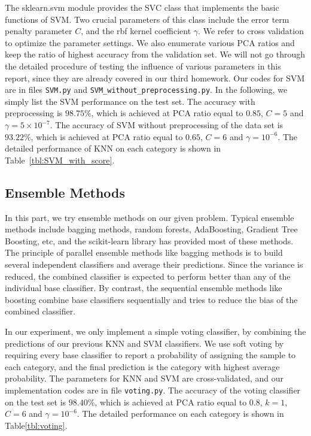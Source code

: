 \documentclass{article}
\begin{document}
The sklearn.svm module provides the SVC class that implements the basic functions of SVM. Two crucial parameters of this class include the error term penalty parameter $C$, and the rbf kernel coefficient $\gamma$. We refer to cross validation to optimize the parameter settings. We also enumerate various PCA ratios and keep the ratio of highest accuracy from the validation set. We will not go through the detailed procedure of testing the influence of various parameters in this report, since they are already covered in our third homework. Our codes for SVM are in files \texttt{SVM.py} and \texttt{SVM\_without\_preprocessing.py}. In the following, we simply list the SVM performance on the test set. The accuracy with preprocessing is $98.75\%$, which is achieved at PCA ratio equal to $0.85$, $C=5$ and $\gamma = 5 \times 10^{-7}$. The accuracy of SVM without preprocessing of the data set is $93.22\%$, which is achieved at PCA ratio equal to $0.65$, $C=6$ and $\gamma = 10^{-6}$. The detailed performance of KNN on each category is shown in Table~\ref{tbl:SVM_with_score}.

\subsection{Ensemble Methods}
In this part, we try ensemble methods on our given problem. Typical ensemble methods include bagging methods, random forests, AdaBoosting, Gradient Tree Boosting, etc, and the scikit-learn library has provided most of these methods. The principle of parallel ensemble methods like bagging methods is to build several independent classifiers and average their predictions. Since the variance is reduced, the combined classifier is expected to perform better than any of the individual base classifier. By contrast, the sequential ensemble methods like boosting combine base classifiers sequentially and tries to reduce the bias of the combined classifier.

In our experiment, we only implement a simple voting classifier, by combining the predictions of our previous KNN and SVM classifiers. We use soft voting by requiring every base classifier to report a probability of assigning the sample to each category, and the final prediction is the category with highest average probability. The parameters for KNN and SVM are cross-validated, and our implementation codes are in file \texttt{voting.py}. The accuracy of the voting classifier on the test set is $98.40\%$, which is achieved at PCA ratio equal to $0.8$, $k=1$, $C=6$ and $\gamma = 10^{-6}$. The detailed performance on each category is shown in Table\ref{tbl:voting}.
\end{document}
